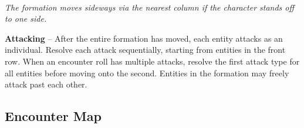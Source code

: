\begin{center}
\\
\emph{The formation moves sideways via the nearest column if the character stands off to one side.}
\end{center}

\textbf{Attacking} -- After the entire formation has moved, each entity attacks as an individual. Resolve each attack sequentially, starting from entities in the front row. When an encounter roll has multiple attacks, resolve the first attack type for all entities before moving onto the second. Entities in the formation may freely attack past each other.

\pagebreak

\subsection*{Encounter Map}
\begin{center}
\end{center}

